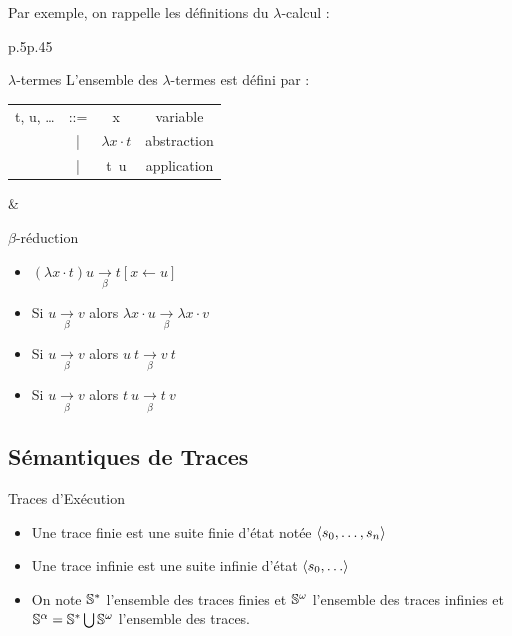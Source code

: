 \documentclass{cours}
\begin{document}
Par exemple, on rappelle les définitions du $\lambda$-calcul :\\\vspace{5pt}
\begin{tabular}{p{.5\linewidth}p{.45\linewidth}}
\begin{définition}{$\lambda$-termes}{}
L'ensemble des $\lambda$-termes est défini par :\vspace{10pt}
\begin{tabular}{cccc}
	t, u, \dots & ::= & x                  & variable\vspace{3pt}    \\
	            & |   & $\lambda x\cdot t$ & abstraction\vspace{3pt} \\
	            & |   & t\ u               & application\vspace{3pt}
\end{tabular}
\end{définition}
& \begin{définition}{$\beta$-réduction}{}
\vspace{-3pt}
\begin{itemize}
	\item $(\lambda x \cdot t) u \xrightarrow[\beta]{} t[x \leftarrow u]$\vspace{-3pt}
	\item Si $u \xrightarrow[\beta]{} v$ alors $\lambda x \cdot u \xrightarrow[\beta]{} \lambda x \cdot v$\vspace{-3pt}
	\item Si $u \xrightarrow[\beta]{} v$ alors $u\ t \xrightarrow[\beta]{} v\ t$\vspace{-3pt}
	\item Si $u \xrightarrow[\beta]{} v$ alors $t\ u \xrightarrow[\beta]{} t\ v$\vspace{-4pt}
\end{itemize}
\end{définition}
\end{tabular}
\vspace{-12pt}
\subsection{Sémantiques de Traces}
\begin{définition}{Traces d'Exécution}{}
\begin{itemize}
	\item Une trace finie est une suite finie d'état notée $\scalar{s_{0}, \ldots, s_{n}}$
	\item Une trace infinie est une suite infinie d'état $\scalar{s_{0},\ldots}$
	\item On note $\S^{*}$ l'ensemble des traces finies et $\S^{\omega}$ l'ensemble des traces infinies et $\S^{\alpha} = \S^{*} \bigcup \S^{\omega}$ l'ensemble des traces.
\end{itemize}
\end{définition}
\end{document}
